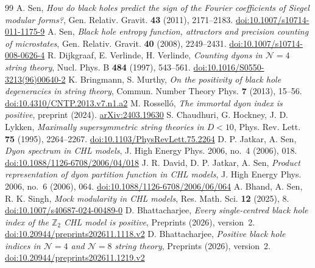 \documentclass[11pt]{amsart}
\numberwithin{equation}{section}
\theoremstyle{plain}
\theoremstyle{definition}
\theoremstyle{remark}
\begin{document}
\begin{thebibliography}{99}
 A. Sen, \emph{How do black holes predict the sign of the Fourier coefficients of Siegel modular forms?}, Gen. Relativ. Gravit. \textbf{43} (2011), 2171--2183. \href{https://doi.org/10.1007/s10714-011-1175-9}{doi:10.1007/s10714-011-1175-9}
 A. Sen, \emph{Black hole entropy function, attractors and precision counting of microstates}, Gen. Relativ. Gravit. \textbf{40} (2008), 2249--2431. \href{https://doi.org/10.1007/s10714-008-0626-4}{doi:10.1007/s10714-008-0626-4}
 R. Dijkgraaf, E. Verlinde, H. Verlinde, \emph{Counting dyons in $\mathcal N=4$ string theory}, Nucl. Phys. B \textbf{484} (1997), 543--561. \href{https://doi.org/10.1016/S0550-3213(96)00640-2}{doi:10.1016/S0550-3213(96)00640-2}
 K. Bringmann, S. Murthy, \emph{On the positivity of black hole degeneracies in string theory}, Commun. Number Theory Phys. \textbf{7} (2013), 15--56. \href{https://doi.org/10.4310/CNTP.2013.v7.n1.a2}{doi:10.4310/CNTP.2013.v7.n1.a2}
 M. Rossell\'o, \emph{The immortal dyon index is positive}, preprint (2024). \href{https://arxiv.org/abs/2403.19630}{arXiv:2403.19630}
 S. Chaudhuri, G. Hockney, J. D. Lykken, \emph{Maximally supersymmetric string theories in $D<10$}, Phys. Rev. Lett. \textbf{75} (1995), 2264--2267. \href{https://doi.org/10.1103/PhysRevLett.75.2264}{doi:10.1103/PhysRevLett.75.2264}
 D. P. Jatkar, A. Sen, \emph{Dyon spectrum in CHL models}, J. High Energy Phys. 2006, no.~4 (2006), 018. \href{https://doi.org/10.1088/1126-6708/2006/04/018}{doi:10.1088/1126-6708/2006/04/018}
 J. R. David, D. P. Jatkar, A. Sen, \emph{Product representation of dyon partition function in CHL models}, J. High Energy Phys. 2006, no.~6 (2006), 064. \href{https://doi.org/10.1088/1126-6708/2006/06/064}{doi:10.1088/1126-6708/2006/06/064}
 A. Bhand, A. Sen, R. K. Singh, \emph{Mock modularity in CHL models}, Res. Math. Sci. \textbf{12} (2025), 8. \href{https://doi.org/10.1007/s40687-024-00489-0}{doi:10.1007/s40687-024-00489-0}
 D. Bhattacharjee, \emph{Every single-centred black hole index of the $\mathbb Z_2$ CHL model is positive}, Preprints (2026), version~2. \href{https://doi.org/10.20944/preprints202611.1118.v2}{doi:10.20944/preprints202611.1118.v2}
 D. Bhattacharjee, \emph{Positive black hole indices in $\mathcal N=4$ and $\mathcal N=8$ string theory}, Preprints (2026), version~2. \href{https://doi.org/10.20944/preprints202611.1219.v2}{doi:10.20944/preprints202611.1219.v2}

\end{thebibliography}
\end{document}
